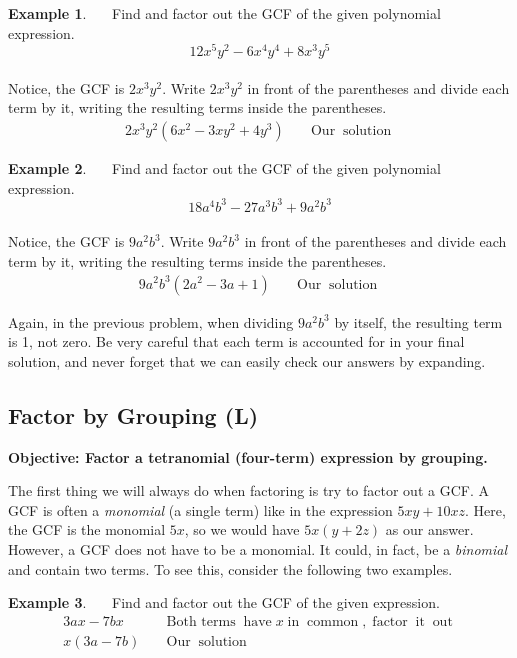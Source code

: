 \documentclass[12pt]{book}
\theoremstyle{definition}
\newtheorem{example}{Example}
\newcommand{\tmop}[1]{\ensuremath{\operatorname{#1}}}
\begin{document}
\begin{example}~~~Find and factor out the GCF of the given polynomial expression.
$$ 12 x^5 y^2 - 6 x^4 y^4 + 8 x^3 y^5$$
~\\
Notice, the GCF is $2x^3y^2$.  Write $2x^3y^2$ in front of the parentheses and divide each term by it, writing the resulting terms inside the parentheses. 
  \begin{eqnarray*}
    2 x^3 y^2 (6 x^2 - 3 x y^2 + 4 y^3) &  & \tmop{Our} \tmop{solution}
  \end{eqnarray*}
\end{example}

\begin{example}~~~Find and factor out the GCF of the given polynomial expression.
$$18 a^4 b^3 - 27 a^3 b^3 + 9 a^2 b^3$$
~\\
Notice, the GCF is $9 a^2 b^3$.  Write $9 a^2 b^3$ in front of the parentheses and divide each term by it, writing the resulting terms inside the parentheses.  
  \begin{eqnarray*}
    9 a^2 b^3 (2 a^2 - 3 a + 1) &  & \tmop{Our} \tmop{solution}
  \end{eqnarray*}
\end{example}

Again, in the previous problem, when dividing $9 a^2 b^3$ by itself, the resulting term is 1, not zero. Be very careful that each term is accounted for in your final solution, and never forget that we can easily check our answers by expanding.
\subsection{Factor by Grouping (L)}
{\bf Objective: Factor a tetranomial (four-term) expression by grouping.}\par
The first thing we will always do when factoring is try to factor out a GCF. A GCF is often a {\it monomial} (a single term) like in the expression $5 x y + 10 x z$.  Here, the GCF is the monomial $5 x$, so we would have $5 x (y + 2 z)$ as our answer. However, a GCF does not have to be a monomial.  It could, in fact, be a {\it binomial} and contain two terms. To see this, consider the following two examples.

\begin{example}~~~Find and factor out the GCF of the given expression.
  \begin{eqnarray*}
    3 a x - 7 b x &  & \tmop{Both~terms} \tmop{have} x \tmop{in} \tmop{common},
    \tmop{factor} \tmop{it} \tmop{out}\\
    x (3 a - 7 b) &  & \tmop{Our} \tmop{solution}
  \end{eqnarray*}
\end{example}
\end{document}
